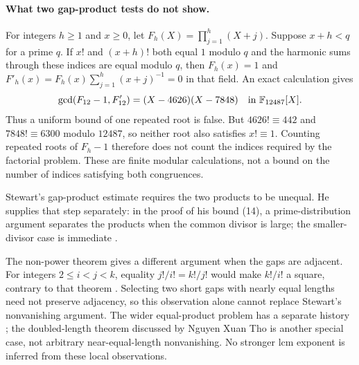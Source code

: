 \paragraph{What two gap-product tests do not show.}
For integers $h\ge1$ and $x\ge0$, let
$F_h(X)=\prod_{j=1}^h(X+j)$. Suppose $x+h<q$ for a prime $q$.
If $x!$ and $(x+h)!$ both equal $1$ modulo $q$ and the harmonic sums
through these indices are equal modulo $q$,
then $F_h(x)=1$ and
$F'_h(x)=F_h(x)\sum_{j=1}^h(x+j)^{-1}=0$ in that field.  An exact calculation gives
\[
 \gcd(F_{12}-1,F'_{12})
 =(X-4626)(X-7848)\quad\hbox{in }\mathbb F_{12487}[X].
\]
Thus a uniform bound of one repeated root is false. But $4626!\equiv442$ and $7848!\equiv6300$
modulo $12487$, so neither root also satisfies $x!\equiv1$. Counting
repeated roots of $F_h-1$ therefore does not count the indices required
by the factorial problem. These are finite modular calculations, not a
bound on the number of indices satisfying both congruences.

Stewart's gap-product estimate
\cite[Lemma~2, (21)--(24)]{stewart2004} requires the two products to be
unequal. He supplies that step separately: in the proof of his bound
(14), a prime-distribution argument separates the products when the common
divisor is large; the smaller-divisor case is immediate
\cite[p.~467, proof of Lemma~2]{stewart2004}.

The non-power theorem gives a different argument when the gaps are
adjacent. For integers $2\le i<j<k$, equality $j!/i!=k!/j!$ would make $k!/i!$ a
square, contrary to that theorem \cite[Theorem~1]{erdos-selfridge1975}.
Selecting two short gaps with nearly equal lengths need not preserve
adjacency, so this observation alone cannot replace Stewart's nonvanishing
argument. The wider equal-product problem has a separate history
\cite{macleod-barrodale1970}; the doubled-length theorem discussed by
Nguyen Xuan Tho \cite[Theorem~1]{nguyen-tho2026} is another special case,
not arbitrary near-equal-length nonvanishing. No stronger lcm exponent is
inferred from these local observations.

